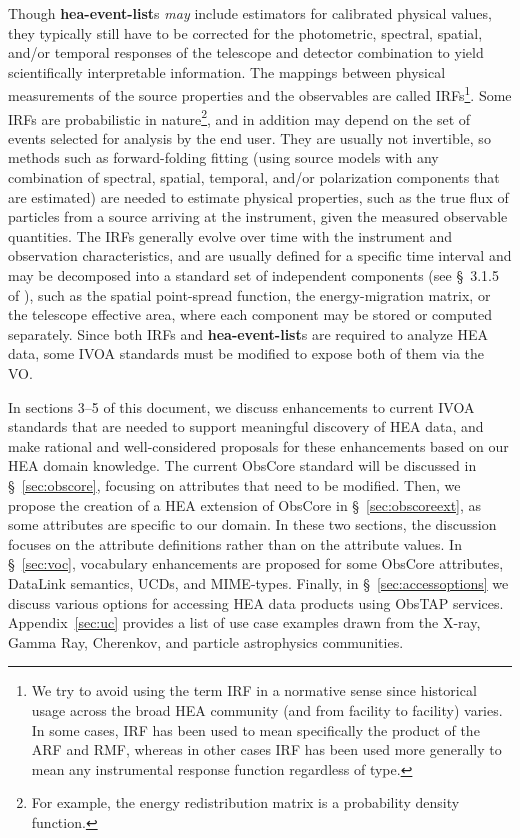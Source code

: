 \documentclass[11pt,a4paper]{ivoa}
\begin{document}
Though {\bf hea-event-list}s {\em may\/} include estimators for calibrated physical values, they typically still have to be corrected for the photometric, spectral, spatial, and/or temporal responses of the telescope and detector combination to yield scientifically interpretable information. The mappings between physical measurements of the source properties and the observables are called \glspl{IRF}\footnote{We try to avoid using the term \gls{IRF} in a normative sense since historical usage across the broad \gls{HEA} community (and from facility to facility) varies. In some cases, \gls{IRF} has been used to mean specifically the product of the \gls{ARF} and \gls{RMF}, whereas in other cases \gls{IRF} has been used more generally to mean any instrumental response function regardless of type.}.  Some \glspl{IRF} are probabilistic in nature\footnote{For example, the energy redistribution matrix is a probability density function.}, and in addition may depend on the set of events selected for analysis by the end user.  They are usually not invertible, so methods such as forward-folding fitting (using source models with any combination of spectral, spatial, temporal, and/or polarization components that are estimated) are needed to estimate physical properties, such as the true flux of particles from a source arriving at the instrument, given the measured observable quantities. The \glspl{IRF} generally evolve over time with the instrument and observation characteristics, and are usually defined for a specific time interval and may be decomposed into a standard set of independent components (see \S~3.1.5 of \citealt{2024ivoa.note.heig}), such as the spatial point-spread function, the energy-migration matrix, or the telescope effective area, where each component may be stored or computed separately.  Since both \glspl{IRF} and {\bf hea-event-list}s are required to analyze \gls{HEA} data, some \gls{IVOA} standards must be modified to expose both of them via the \gls{VO}.

In sections 3--5 of this document, we discuss enhancements to current \gls{IVOA} standards that are needed to support meaningful discovery of \gls{HEA} data, and make rational and well-considered proposals for these enhancements based on our \gls {HEA} domain knowledge.  The current ObsCore standard will be discussed in \S~\ref{sec:obscore}, focusing on attributes that need to be modified. Then, we propose the creation of a \gls{HEA} extension of ObsCore in \S~\ref{sec:obscoreext}, as some attributes are specific to our domain. In these two sections, the discussion focuses on the attribute definitions rather than on the attribute values. In \S~\ref{sec:voc}, vocabulary enhancements are proposed for some ObsCore attributes, DataLink semantics, UCDs, and MIME-types. Finally, in \S~\ref{sec:accessoptions} we discuss various options for accessing \gls{HEA} data products using ObsTAP services. Appendix~\ref{sec:uc} provides a list of use case examples drawn from the X-ray, Gamma Ray, Cherenkov, and particle astrophysics communities. 
\end{document}
